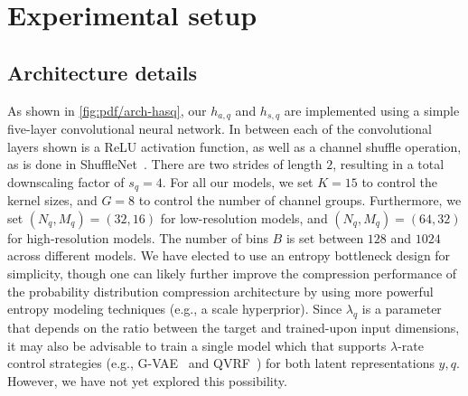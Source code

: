 



\section{Experimental setup}
\label{sec:pdf_compression/experimental_setup}

\subsection{Architecture details}
\label{sec:pdf_compression/experimental_setup/architecture_details}

As shown in \cref{fig:pdf/arch-hasq}, our $h_{a,q}$ and $h_{s,q}$ are implemented using a simple five-layer convolutional neural network.
In between each of the convolutional layers shown is a ReLU activation function, as well as a channel shuffle operation, as is done in ShuffleNet~\cite{zhang2017shufflenet}.
There are two strides of length $2$, resulting in a total downscaling factor of $s_q = 4$.
For all our models, we set $K = 15$ to control the kernel sizes, and $G = 8$ to control the number of channel groups.
Furthermore, we set $(N_q, M_q) = (32, 16)$ for low-resolution models, and $(N_q, M_q) = (64, 32)$ for high-resolution models.
The number of bins $B$ is set between $128$ and $1024$ across different models.
We have elected to use an entropy bottleneck design for simplicity, though one can likely further improve the compression performance of the probability distribution compression architecture by using more powerful entropy modeling techniques (e.g., a scale hyperprior).
Since $\lambda_q$ is a parameter that depends on the ratio between the target and trained-upon input dimensions, it may also be advisable to train a single model which that supports $\lambda$-rate control strategies (e.g., G-VAE~\cite{cui2020gvae,cui2022asymmetric} and QVRF~\cite{tong2023qvrf}) for both latent representations $y, q$.
However, we have not yet explored this possibility.
%

